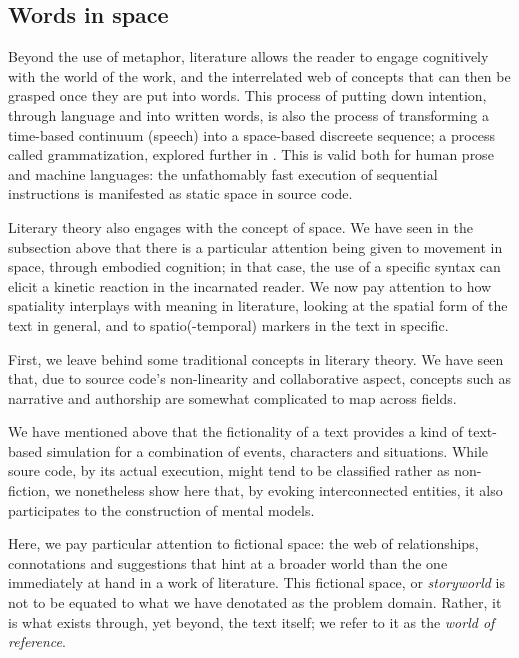 \subsection{Words in space}
\label{subsec:spatial-literature}

Beyond the use of metaphor, literature allows the reader to engage cognitively with the world of the work, and the interrelated web of concepts that can then be grasped once they are put into words. This process of putting down intention, through language and into written words, is also the process of transforming a time-based continuum (speech) into a space-based discreete sequence; a process called grammatization, explored further in \citep{bouchardon_valeur_2014}. This is valid both for human prose and machine languages: the unfathomably fast execution of sequential instructions is manifested as static space in source code.

Literary theory also engages with the concept of space. We have seen in the subsection above that there is a particular attention being given to movement in space, through embodied cognition; in that case, the use of a specific syntax can elicit a kinetic reaction in the incarnated reader. We now pay attention to how spatiality interplays with meaning in literature, looking at the spatial form of the text in general, and to spatio(-temporal) markers in the text in specific.

First, we leave behind some traditional concepts in literary theory. We have seen that, due to source code's non-linearity and collaborative aspect, concepts such as narrative and authorship are somewhat complicated to map across fields.

We have mentioned above that the fictionality of a text provides a kind of text-based simulation for a combination of events, characters and situations. While soure code, by its actual execution, might tend to be classified rather as non-fiction, we nonetheless show here that, by evoking interconnected entities, it also participates to the construction of mental models.

Here, we pay particular attention to fictional space: the web of relationships, connotations and suggestions that hint at a broader world than the one immediately at hand in a work of literature. This fictional space, or \emph{storyworld} is not to be equated to what we have denotated as the problem domain. Rather, it is what exists through, yet beyond, the text itself; we refer to it as the \emph{world of reference}.

